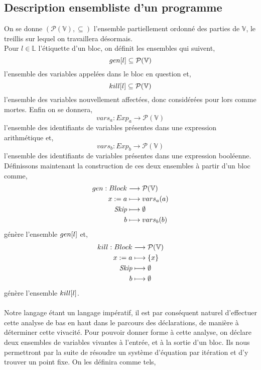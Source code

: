 \documentclass[a4paper, 11pt]{article}
\begin{document}
\subsection{Description ensembliste d'un programme}
On se donne $(\mathcal{P}(\mathbb{V}), \subseteq)$ l'ensemble partiellement ordonné des parties de $\mathbb{V}$, 
le treillis sur lequel on travaillera désormais.
\\
Pour $l \in \mathbb{L}$ l'étiquette d'un bloc, on définit les ensembles qui suivent,
\[gen[l] \subseteq \mathcal{P}(\mathbb{V})\]
l'ensemble des variables appelées dans le bloc en question et,
\[kill[l] \subseteq \mathcal{P}(\mathbb{V})\]
l'ensemble des variables nouvellement affectées, donc considérées pour lors comme mortes. Enfin on se donnera,
\[vars_a : Exp_a \longrightarrow \mathcal{P}(\mathbb{V})\]
l'ensemble des identifiants de variables présentes dans une expression arithmétique et,
\[vars_b : Exp_b \longrightarrow \mathcal{P}(\mathbb{V})\]
l'ensemble des identifiants de variables présentes dans une expression booléenne.
\\
Définissons maintenant la construction de ces deux ensembles à partir d'un bloc comme,
\begin{align*}
	gen : Block &\longrightarrow \mathcal{P}(\mathbb{V})\\
	{x}\space:=\space{a} &\longmapsto vars_a(a)\\
	\textit{Skip} &\longmapsto \emptyset\\
	b &\longmapsto vars_b(b)
\end{align*}
génère l'ensemble $gen[l]$ et,
\begin{align*}
	kill : Block &\longrightarrow \mathcal{P}(\mathbb{V})\\
	{x}\space:=\space{a} &\longmapsto \{x\}\\
	\textit{Skip} &\longmapsto \emptyset\\
	b &\longmapsto \emptyset
\end{align*}
génère l'ensemble $kill[l]$.
\\
\\
Notre langage étant un langage impératif, il est par conséquent naturel d'effectuer cette analyse de bas en haut dans le parcours des déclarations,
de manière à déterminer cette vivacité. Pour pouvoir donner forme à cette analyse, on déclare deux ensembles de variables vivantes à l'entrée, et à la
sortie d'un bloc. Ils nous permettront par la suite de résoudre un système d'équation par itération et d'y trouver un point fixe. 
On les définira comme tels,
\end{document}
